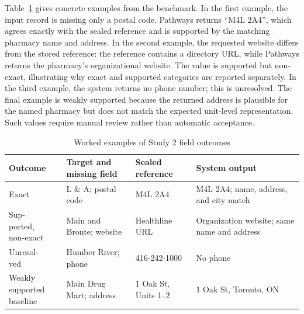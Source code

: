 \documentclass[12pt,oneside]{report}
\begin{document}
Table~\ref{tab:study2_examples} gives concrete examples from the benchmark. In the first example, the input record is missing only a postal code. Pathways returns ``M4L 2A4'', which agrees exactly with the sealed reference and is supported by the matching pharmacy name and address. In the second example, the requested website differs from the stored reference: the reference contains a directory URL, while Pathways returns the pharmacy's organizational website. The value is supported but non-exact, illustrating why exact and supported categories are reported separately. In the third example, the system returns no phone number; this is unresolved. The final example is weakly supported because the returned address is plausible for the named pharmacy but does not match the expected unit-level representation. Such values require manual review rather than automatic acceptance.

\begin{table}[H]
\caption{Worked examples of Study 2 field outcomes}
\label{tab:study2_examples}
\centering
\small
\begin{tabularx}{\textwidth}{@{}p{1.8cm}p{3.4cm}X@{}X@{}}
\toprule
\parbox[t]{1.8cm}{\raggedright\textbf{Outcome}} & \textbf{Target and missing field} & \textbf{Sealed reference} & \textbf{System output} \\
\midrule
Exact & L \& A; postal code & M4L 2A4 & M4L 2A4; name, address, and city match \\
\parbox[t]{1.8cm}{\raggedright Sup-\\ported,\\non-exact} & Main and Bronte; website & Healthline URL & Organization website; same name and address \\
\parbox[t]{1.8cm}{\raggedright Unresol-\\ved} & Humber River; phone & 416-242-1000 & No phone \\
\parbox[t]{1.8cm}{\raggedright Weakly supported\\baseline} & Main Drug Mart; address & 1 Oak St, Units 1--2 & 1 Oak St, Toronto, ON \\
\bottomrule
\end{tabularx}
\end{table}
\end{document}
